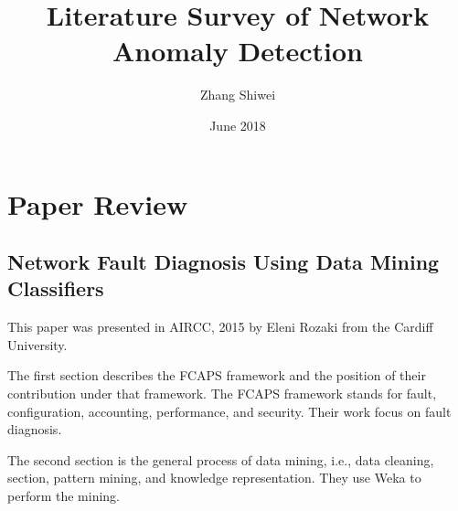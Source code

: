\documentclass{manuscript}
\title{Literature Survey of Network Anomaly Detection}
\author{Zhang Shiwei}
\date{June 2018}
\begin{document}
    \maketitle

    \section{Paper Review}

    \subsection{Network Fault Diagnosis Using Data Mining Classifiers \textsuperscript{\cite{rozaki_network_2015}}}

    This paper was presented in AIRCC, 2015 by Eleni Rozaki from the Cardiff University.

    The first section describes the FCAPS framework and the position of their contribution under that framework. The
    FCAPS framework stands for fault, configuration, accounting, performance, and security. Their work focus on fault
    diagnosis.

    The second section is the general process of data mining, i.e., data cleaning, section, pattern mining, and knowledge
    representation. They use Weka to perform the mining.
\end{document}
